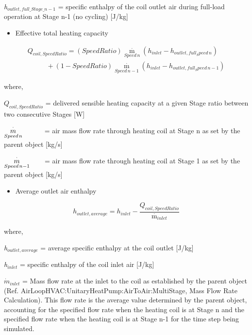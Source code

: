 \emph{h\(_{outlet,full\_Stage\_n-1}\)} = specific enthalpy of the coil outlet air during full-load operation at Stage n-1 (no cycling) {[}J/kg{]}

\begin{itemize}
  \item Effective total heating capacity
\end{itemize}

\begin{equation}
  \begin{array}{l}
    Q_{coil,SpeedRatio} = \left( SpeedRatio \right){\mathop m\limits^\cdot_{Speed\,n}}(h_{inlet} - h_{outlet,full_Speed\,n}) \\
    \;\;\;\;\;\;\;\;\;\; + (1 - SpeedRatio) {\mathop m\limits^\cdot_{Speed\,n - 1}}(h_{inlet} - h_{outlet,full_Speed\,n - 1})
  \end{array}
\end{equation}

where,

\({{Q_{coil,SpeedRatio}}}\) = delivered sensible heating capacity at a given Stage ratio between two consecutive Stages {[}W{]}

\({\mathop {{\rm{ }}m}\limits_{Speed{\kern 1pt} n}^ \cdot }\) ~~~~~ = air mass flow rate through heating coil at Stage n as set by the parent object {[}kg/s{]}

\({\mathop {{\rm{ }}m}\limits_{Speed{\kern 1pt} n - 1}^ \cdot }\) ~~~ = air mass flow rate through heating coil at Stage 1 as set by the parent object {[}kg/s{]}

\begin{itemize}
  \item Average outlet air enthalpy
\end{itemize}

\begin{equation}
  h_{outlet,average} = h_{inlet} - \frac{Q_{coil,SpeedRatio}}{{\mathop m\limits^\cdot }_{inlet}}
\end{equation}

where,

\emph{h\(_{outlet,average}\)} = average specific enthalpy at the coil outlet {[}J/kg{]}

\emph{h\(_{inlet}\)} = specific enthalpy of the coil inlet air {[}J/kg{]}

\({\dot m_{inlet}}\) = Mass flow rate at the inlet to the coil as established by the parent object (Ref. AirLoopHVAC:UnitaryHeatPump:AirToAir:MultiStage, Mass Flow Rate Calculation). This flow rate is the average value determined by the parent object, accounting for the specified flow rate when the heating coil is at Stage n and the specified flow rate when the heating coil is at Stage n-1 for the time step being simulated.

